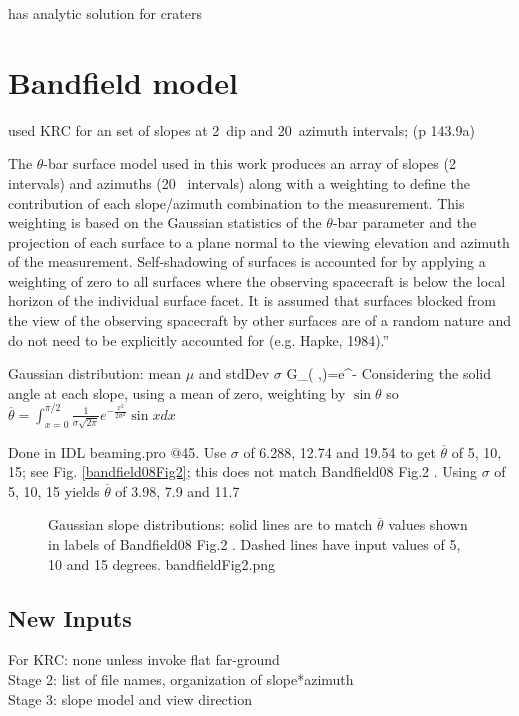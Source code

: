 \documentclass{article}
\begin{document}
 has analytic solution for craters

\section{Bandfield model}

 used KRC for an set of slopes at 2\qd ~dip and 20\qd ~azimuth intervals; (p 143.9a)

The $\theta$-bar surface model used in this work produces an array of slopes
(2\qd~ intervals) and azimuths (20\qd~ intervals) along with a weighting to
define the contribution of each slope/azimuth combination to the
measurement. This weighting is based on the Gaussian statistics of the
$\theta$-bar parameter and the projection of each surface to a plane normal to
the viewing elevation and azimuth of the measurement. Self-shadowing of surfaces
is accounted for by applying a weighting of zero to all surfaces where the
observing spacecraft is below the local horizon of the individual surface
facet. It is assumed that surfaces blocked from the view of the observing
spacecraft by other surfaces are of a random nature and do not need to be
explicitly accounted for (e.g. Hapke, 1984).''

Gaussian distribution: mean $\mu$ and stdDev $\sigma$
\qb G_{( \sigma,\mu )}=e^{-} \qe
Considering the solid angle at each slope, using a mean of zero, 
weighting by $\sin \theta$ 
so $\overline{\theta}=\int_{x=0}^{\pi/2} \frac{1}{\sigma \sqrt{2 \pi}}e^{-\frac{x^2}{2 \sigma^2}} \sin x dx $

Done in IDL beaming.pro @45.
 Use  $\sigma$ of 6.288, 12.74 and 19.54 to get $\overline{\theta}$ of 5, 10, 15; see Fig. \ref{bandfield08Fig2}; this does not match Bandfield08 Fig.2 .  Using $\sigma$ of 5, 10, 15 yields  $\overline{\theta}$ of 3.98, 7.9 and 11.7 

\begin{figure}[!ht] 
\caption[Gaussian slopes ]{Gaussian slope distributions: solid lines are to match  $\overline{\theta}$ values shown in labels of Bandfield08 Fig.2 . Dashed lines have input values of 5, 10 and 15 degrees. 
\label{bandfieldFig2} bandfieldFig2.png  }
\end{figure} 
\subsection{New Inputs} %
For KRC:  none unless invoke flat far-ground
\\ Stage 2: list of file names, organization of slope*azimuth
\\ Stage 3: slope model and view direction
\end{document}
